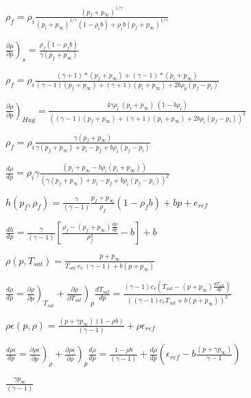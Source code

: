 \documentclass{article}
\begin{document}
$ \rho_f = \rho_i \frac{(p_f + p_{\infty})^{1/\gamma}}{(p_i + p_{\infty})^{1/\gamma} (1-\rho_i b) + \rho_i b (p_f + p_{\infty})^{1/\gamma}} $
\pagebreak

$ \left. \frac{\partial \rho}{\partial p} \right)_s = \frac{\rho_f (1-\rho_f b)}{\gamma (p_f+p_{\infty})} $
\pagebreak

$ \rho_f =\rho_i\frac{ (\gamma + 1)*(p_f+p_{\infty}) + (\gamma - 1)*(p_i+p_{\infty})}{(\gamma - 1)(p_f+p_{\infty}) +(\gamma + 1)(p_i+p_{\infty}) + 2 b \rho_0 (p_f-p_i)} $
\pagebreak

$  \left.  \frac{\partial \rho}{\partial p} \right)_{Hug} = \frac{4\gamma \rho_i \ (p_i+p_{\infty}) \ (1- b\rho_i)}{ \left( (\gamma - 1)(p_f+p_{\infty}) +(\gamma + 1)(p_i+p_{\infty}) +2b\rho_i (p_f-p_i)\right) ^2} $
\pagebreak

$ \rho_f = \rho_i \frac{\gamma (p_f+p_{\infty})}{\gamma (p_f+p_{\infty}) + p_i - p_f + b \rho_i (p_f -p_i)} $
\pagebreak

$ \frac{d\rho}{dp} = \rho_i \gamma \frac{\left(p_i + p_{\infty}-b \rho_i (p_i + p_{\infty})\right)}{\left(\gamma (p_f+p_{\infty}) + p_i - p_f+b \rho_i (p_f - p_i)\right)^2} $
\pagebreak

$ h(p_f,{\rho_f})= \frac{\gamma}{(\gamma-1)}\frac{p_f+p_{\infty}}{\rho_f} (1-\rho_f b) + b p + e_{ref} $
\pagebreak

$ \frac{dh}{dp}=\frac{\gamma}{(\gamma-1)}\left[\frac{ \rho_f - (p_f+p_{\infty})  \frac{d\rho}{dp}  }{\rho_f^2}-b\right] +b $
\pagebreak

$  \rho(p, T_{sat})  =  \frac{p+p_{\infty}}{T_{sat} \ c_v \ (\gamma-1) + b(p+p_{\infty})} $
\pagebreak

$ \frac{d \rho}{d p} = \left.  \frac{\partial \rho}{\partial p} \right)_{T_{sat}} + \left.  \frac{\partial \rho}{\partial T_{sat} } \right)_p  \frac{d T_{sat}}{d p} =\frac{(\gamma-1)c_v\left(T_{sat} - (p+p_{\infty})\frac{d T_{sat}}{d p}\right) }{\left((\gamma-1)c_vT_{sat} + b(p+p_{\infty}) \right)^2 } $
\pagebreak

$  \rho\epsilon(p, \rho) = \frac{(p+\gamma p_{\infty})(1-\rho b)}{(\gamma-1)} +\rho\epsilon_{ref} $
\pagebreak

$ \frac{d \rho\epsilon}{d p} =\left.  \frac{\partial \rho\epsilon}{\partial p} \right)_{\rho} + \left.  \frac{\partial \rho\epsilon}{\partial\rho  } \right)_p \frac{d\rho}{dp} = \frac{1-\rho b}{(\gamma-1)} +\frac{d \rho}{d p}\left(\epsilon_{ref}-b\frac{(p+\gamma p_{\infty})}{\gamma-1}\right) $
\pagebreak

$  \frac{\gamma p_{\infty}}{(\gamma-1)} $
\pagebreak
\end{document}
